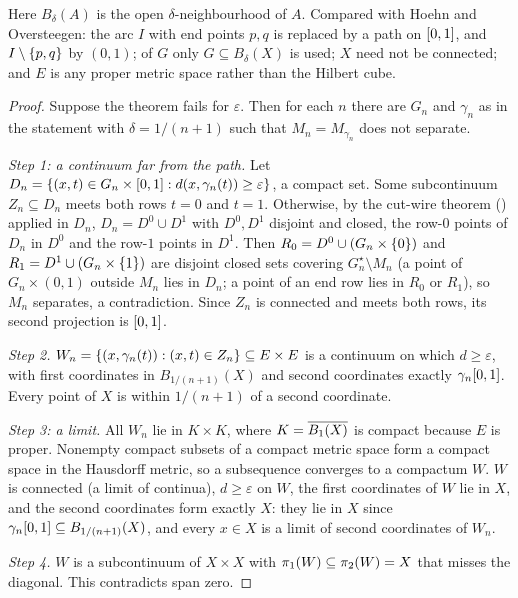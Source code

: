 Here $B_\delta(A)$ is the open $\delta$-neighbourhood of $A$. Compared with Hoehn and Oversteegen: the arc $I$ with end points $p,q$ is replaced by a path
on $[0,1]$, and $I\setminus\left\{ p,q \right\}$ by $(0,1)$; of $G$ only $G\subseteq B_\delta(X)$ is used; $X$ need not be connected; and $E$ is any proper metric
space rather than the Hilbert cube.

\begin{proof}
Suppose the theorem fails for $\varepsilon$. Then for each $n$ there are $G_n$ and $\gamma_n$ as in the statement with $\delta=1/(n+1)$ such that $M_n=M_{\gamma_n}$
does not separate.

\emph{Step 1: a continuum far from the path.} Let $D_n=\left\{ (x,t)\in G_n\times[0,1] : d(x,\gamma_n(t))\ge\varepsilon \right\}$, a compact set. Some
subcontinuum $Z_n\subseteq D_n$ meets both rows $t=0$ and $t=1$. Otherwise, by the cut-wire theorem () applied in $D_n$, $D_n=D^0\cup
D^1$ with $D^0,D^1$ disjoint and closed, the row-$0$ points of $D_n$ in $D^0$ and the row-$1$ points in $D^1$. Then $R_0=D^0\cup(G_n\times\left\{ 0 \right\})$ and
$R_1=D^1\cup(G_n\times\left\{ 1 \right\})$ are disjoint closed sets covering $G_n^\star\setminus M_n$ (a point of $G_n\times(0,1)$ outside $M_n$ lies in $D_n$; a point
of an end row lies in $R_0$ or $R_1$), so $M_n$ separates, a contradiction. Since $Z_n$ is connected and meets both rows, its second
projection is $[0,1]$.

\emph{Step 2.} $W_n=\left\{ (x,\gamma_n(t)) : (x,t)\in Z_n \right\}\subseteq E\times E$ is a continuum on which $d\ge\varepsilon$, with first coordinates in
$B_{1/(n+1)}(X)$ and second coordinates exactly $\gamma_n[0,1]$. Every point of $X$ is within $1/(n+1)$ of a second coordinate.

\emph{Step 3: a limit.} All $W_n$ lie in $K\times K$, where $K=\overline{B_1(X)}$ is compact because $E$ is proper. Nonempty compact subsets of a compact
metric space form a compact space in the Hausdorff metric, so a subsequence converges to a compactum $W$. $W$ is connected (a limit of continua),
$d\ge\varepsilon$ on $W$, the first coordinates of $W$ lie in $X$, and the second coordinates form exactly $X$: they lie in $X$ since
$\gamma_n[0,1]\subseteq B_{1/(n+1)}(X)$, and every $x\in X$ is a limit of second coordinates of $W_n$.

\emph{Step 4.} $W$ is a subcontinuum of $X\times X$ with $\pi_{1}(W)\subseteq\pi_{2}(W)=X$ that misses the diagonal. This contradicts span zero.
\end{proof}


